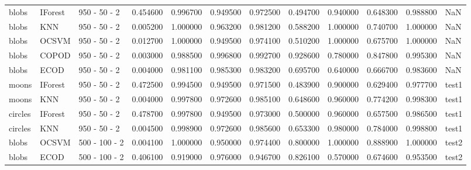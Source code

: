 \documentclass{article}
\begin{document}
\begin{longtable}{lllrrrrrrrrl}
blobs & IForest & 950 - 50 - 2 & 0.454600 & 0.996700 & 0.949500 & 0.972500 & 0.494700 & 0.940000 & 0.648300 & 0.988800 & NaN \\
blobs & KNN & 950 - 50 - 2 & 0.005200 & 1.000000 & 0.963200 & 0.981200 & 0.588200 & 1.000000 & 0.740700 & 1.000000 & NaN \\
blobs & OCSVM & 950 - 50 - 2 & 0.012700 & 1.000000 & 0.949500 & 0.974100 & 0.510200 & 1.000000 & 0.675700 & 1.000000 & NaN \\
blobs & COPOD & 950 - 50 - 2 & 0.003000 & 0.988500 & 0.996800 & 0.992700 & 0.928600 & 0.780000 & 0.847800 & 0.995300 & NaN \\
blobs & ECOD & 950 - 50 - 2 & 0.004000 & 0.981100 & 0.985300 & 0.983200 & 0.695700 & 0.640000 & 0.666700 & 0.983600 & NaN \\
moons & IForest & 950 - 50 - 2 & 0.472500 & 0.994500 & 0.949500 & 0.971500 & 0.483900 & 0.900000 & 0.629400 & 0.977700 & test1 \\
moons & KNN & 950 - 50 - 2 & 0.004000 & 0.997800 & 0.972600 & 0.985100 & 0.648600 & 0.960000 & 0.774200 & 0.998300 & test1 \\
circles & IForest & 950 - 50 - 2 & 0.478700 & 0.997800 & 0.949500 & 0.973000 & 0.500000 & 0.960000 & 0.657500 & 0.986500 & test1 \\
circles & KNN & 950 - 50 - 2 & 0.004500 & 0.998900 & 0.972600 & 0.985600 & 0.653300 & 0.980000 & 0.784000 & 0.998800 & test1 \\
blobs & OCSVM & 500 - 100 - 2 & 0.004100 & 1.000000 & 0.950000 & 0.974400 & 0.800000 & 1.000000 & 0.888900 & 1.000000 & test2 \\
blobs & ECOD & 500 - 100 - 2 & 0.406100 & 0.919000 & 0.976000 & 0.946700 & 0.826100 & 0.570000 & 0.674600 & 0.953500 & test2 \\
\end{longtable}
\end{document}
